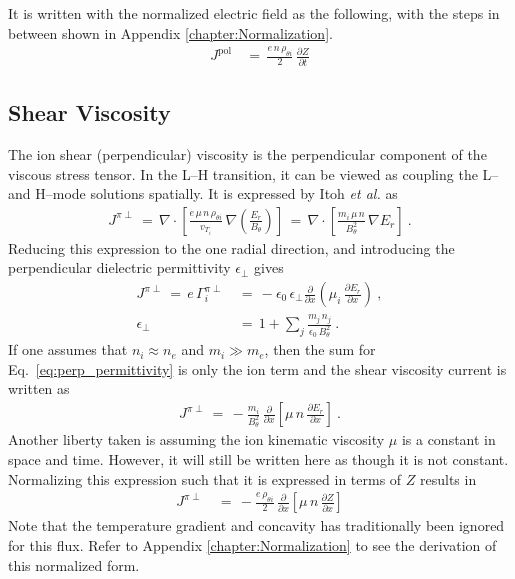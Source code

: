 It is written with the normalized electric field as the following, with the steps in between shown in Appendix \ref{chapter:Normalization}.
\begin{align} %
	J^\text{pol} \,&=\, \frac{e \, n \, \rho_{\theta i}}{2} \,
		\frac{\partial Z}{\partial t} \label{eq:polarization_current_normalized}
\end{align}


\subsection{Shear Viscosity}\label{ssec:shear_viscosity}
The ion shear (perpendicular) viscosity is the perpendicular component of the viscous stress tensor.
In the L--H transition, it can be viewed as coupling the L-- and H--mode solutions spatially.
It is expressed by Itoh \emph{et al.} \cite{itoh_elmy_1993} as
\begin{align} %
	J^{\pi\perp} \,=\, \nabla \cdot \left[\frac{e \, \mu \, n \,
		\rho_{\theta i}}{v_{T_i}} \, \nabla\left(\frac{E_r}{B_\theta}\right)
		\right]
		\,=\, \nabla \cdot \left[\frac{m_i \, \mu \, n}{B_\theta^2} \,
		\nabla E_r\right]~. \label{eq:shear_visc_current_definition}
\end{align}
Reducing this expression to the one radial direction, and introducing the perpendicular dielectric permittivity $\epsilon_\perp$ \cite{kiviniemi_numerical_2001} gives
\begin{align} %
	J^{\pi\perp} \,=\, e\,\Gamma_i^{\pi\perp} \,&=\,
		-\epsilon_0\,\epsilon_\perp \frac{\partial}{\partial x}
		\left(\mu_i \, \frac{\partial E_r}{\partial x}\right)~, \\
	\epsilon_\perp \,&=\, 1 + \sum_j \frac{m_j \, n_j}{\epsilon_0 \, B_\theta^2}~.
		\label{eq:perp_permittivity}
\end{align}
If one assumes that $n_i \approx n_e$ and $m_i \gg m_e$, then the sum for Eq.~\ref{eq:perp_permittivity} is only the ion term and the shear viscosity current is written as
\begin{align} %
	J^{\pi\perp} \,=\, -\frac{m_i}{B_\theta^2} \,
		\frac{\partial}{\partial x} \left[\mu \, n \,
		\frac{\partial E_r}{\partial x}\right]~. \label{eq:shear_current_E_r}
\end{align}
Another liberty taken is assuming the ion kinematic viscosity $\mu$ is a constant in space and time.
However, it will still be written here as though it is not constant.
Normalizing this expression such that it is expressed in terms of $Z$ results in
\begin{align} %
	J^{\pi\perp} \,&=\, -\frac{e \, \rho_{\theta i}}{2} \,
		\frac{\partial}{\partial x} \left[\mu \, n \, \frac{\partial Z}
		{\partial x}\right] \label{eq:shear_current_normalized}
\end{align}
Note that the temperature gradient and concavity has traditionally been ignored for this flux.
Refer to Appendix \ref{chapter:Normalization} to see the derivation of this normalized form.



